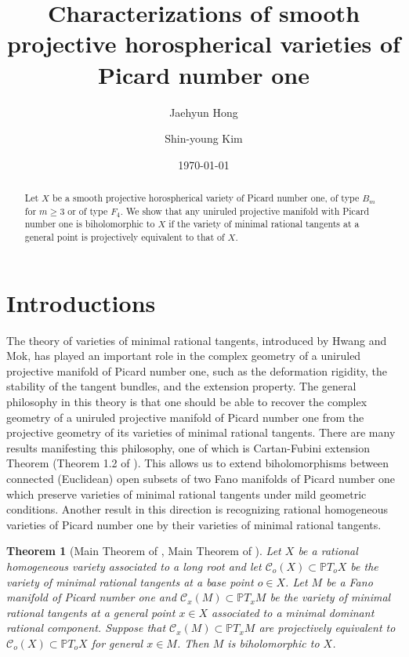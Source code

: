\documentclass[12pt]{amsart}
\title[Characterizations of horospherical varieties]{Characterizations of smooth projective horospherical varieties of Picard number one}
\date{\today}
\author[J. Hong]{Jaehyun Hong}
\author[S.-Y. Kim]{Shin-young Kim}
\theoremstyle{plain}
\newtheorem{theorem} {Theorem} [section]
\theoremstyle{definition}
\begin{document}
\begin{abstract}
Let $X$ be a  smooth projective horospherical variety of Picard number one, of type $B_m$ for $m \geq 3$ or of type $F_4$. We show that any uniruled projective manifold with Picard number one is biholomorphic to $X$ if the variety of minimal rational tangents at a general point is projectively equivalent to that of $X$. %
\end{abstract}



\maketitle

\section{Introductions}



The theory of varieties of minimal rational tangents, introduced by Hwang and Mok, has played an important role in the complex geometry of a uniruled projective manifold of Picard number one, such as the deformation rigidity, the stability of the tangent bundles,
and the extension property. The general philosophy in this theory is that one should be able to recover the complex geometry of a uniruled projective manifold of Picard number
one from the projective geometry of its varieties of minimal rational tangents. There are many results manifesting this philosophy, one of which is Cartan-Fubini extension Theorem (Theorem 1.2 of \cite{HM01}). This allows us to extend biholomorphisms between connected (Euclidean) open subsets of two Fano manifolds of Picard number one which preserve varieties of minimal rational tangents under mild geometric conditions. Another result in this direction is recognizing rational homogeneous varieties of Picard number one by their varieties of minimal rational tangents.

\begin{theorem} [Main Theorem of \cite{Mk08}, Main Theorem of \cite{HH}] \label{previous results} Let $X$ be a rational homogeneous variety associated to a long root and let $\mathcal C_o(X) \subset \mathbb PT_{o}X$ be the variety of minimal rational tangents at a base point $o \in X$. Let $M$ be a Fano manifold of Picard number one and $\mathcal C_x(M) \subset \mathbb PT_xM$ be the variety of minimal rational tangents at a general point $x \in X$ associated to a minimal dominant rational component. Suppose that $\mathcal C_x(M) \subset \mathbb PT_xM$ are projectively equivalent to $\mathcal C_o (X)\subset \mathbb PT_oX$ for general $x \in M$. Then $M$ is biholomorphic to $X$.
\end{theorem}
\end{document}

